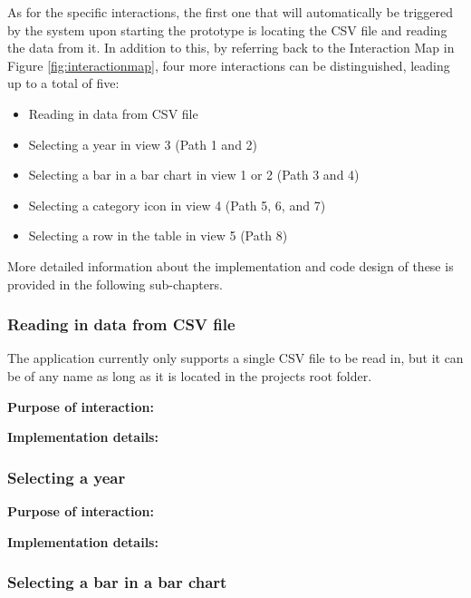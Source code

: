 As for the specific interactions, the first one that will automatically be triggered by the system upon starting the prototype is locating the CSV file and reading the data from it. In addition to this, by referring back to the Interaction Map in Figure \ref{fig:interactionmap}, four more interactions can be distinguished, leading up to a total of five:
\begin{itemize}[noitemsep,nolistsep]
	\item Reading in data from CSV file
	\item Selecting a year in view 3 (Path 1 and 2)
	\item Selecting a bar in a bar chart in view 1 or 2 (Path 3 and 4)
	\item Selecting a category icon in view 4 (Path 5, 6, and 7)
	\item Selecting a row in the table in view 5 (Path 8)
\end{itemize}
More detailed information about the implementation and code design of these is provided in the following sub-chapters.


\subsubsection{Reading in data from CSV file}

The application currently only supports a single CSV file to be read in, but it can be of any name as long as it is located in the projects root folder.

\textbf{Purpose of interaction:}

\textbf{Implementation details:}



\subsubsection{Selecting a year}

\textbf{Purpose of interaction:}

\textbf{Implementation details:}


\subsubsection{Selecting a bar in a bar chart}

